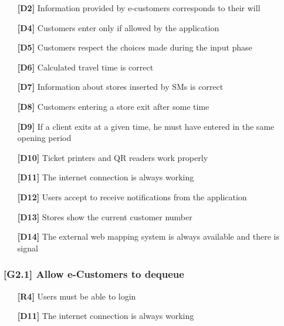 \begin{itemize}
	\item [\textbf{[D2]}] Information provided by e-customers corresponds to their will
	\item [\textbf{[D4]}] Customers enter only if allowed by the application
	\item [\textbf{[D5]}] Customers respect the choices made during the input phase
	\item [\textbf{[D6]}] Calculated travel time is correct
	\item [\textbf{[D7]}] Information about stores inserted by SMs is correct
	\item [\textbf{[D8]}] Customers entering a store exit after some time
	\item [\textbf{[D9]}] If a client exits at a given time, he must have entered in the same opening period
	\item [\textbf{[D10]}] Ticket printers and QR readers work properly
	\item [\textbf{[D11]}] The internet connection is always working
	\item [\textbf{[D12]}] Users accept to receive notifications from the application
	\item [\textbf{[D13]}] Stores show the current customer number
	\item [\textbf{[D14]}] The external web mapping system is always available and there is signal
\end{itemize}

\subsubsection{[G2.1] Allow e-Customers to dequeue}
\begin{itemize}
	\setlength\itemsep{-1mm}
	\item [\textbf{[R4]}] Users must be able to login
	\\
	\item [\textbf{[D11]}] The internet connection is always working
\end{itemize}

